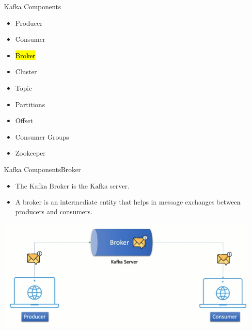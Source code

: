 \documentclass{beamer}
\begin{document}
\begin{frame}{Kafka Components}
  \begin{itemize}
    \item Producer
    \item Consumer
    \item \hl{Broker}
    \item Cluster
    \item Topic
    \item Partitions
    \item Offset
    \item Consumer Groups
    \item Zookeeper
  \end{itemize}
\end{frame}

\begin{frame}{Kafka Components}{Broker}
  \begin{itemize}
    \item The Kafka Broker is the Kafka server.
    \item A broker is an intermediate entity that helps in message exchanges between producers and consumers.
  \end{itemize}
  \vspace*{1.5em}
  \includegraphics[scale=0.15]{fig/broker.png}
\end{frame}
\end{document}
